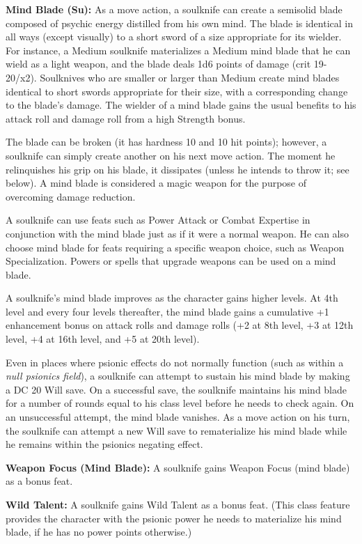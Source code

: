 \documentclass{article}
\begin{document}
\textbf{Mind Blade (Su):} As a move action, a soulknife can create a semisolid 
blade composed of psychic energy distilled from his own mind. The blade is identical 
in all ways (except visually) to a short sword of a size appropriate for its wielder. 
For instance, a Medium soulknife materializes a Medium mind blade that he can wield 
as a light weapon, and the blade deals 1d6 points of damage (crit 19-20/x2). Soulknives 
who are smaller or larger than Medium create mind blades identical to short swords 
appropriate for their size, with a corresponding change to the blade's damage. 
The wielder of a mind blade gains the usual benefits to his attack roll and damage 
roll from a high Strength bonus.

The blade can be broken (it has hardness 10 and 10 hit points); however, a soulknife 
can simply create another on his next move action. The moment he relinquishes his 
grip on his blade, it dissipates (unless he intends to throw it; see below). A 
mind blade is considered a magic weapon for the purpose of overcoming damage reduction.

A soulknife can use feats such as Power Attack or Combat Expertise in conjunction 
with the mind blade just as if it were a normal weapon. He can also choose mind 
blade for feats requiring a specific weapon choice, such as Weapon Specialization. 
Powers or spells that upgrade weapons can be used on a mind blade.

A soulknife's mind blade improves as the character gains higher levels. At 4th 
level and every four levels thereafter, the mind blade gains a cumulative +1 enhancement 
bonus on attack rolls and damage rolls (+2 at 8th level, +3 at 12th level, +4 at 
16th level, and +5 at 20th level).

Even in places where psionic effects do not normally function (such as within a 
\textit{null psionics field}), a soulknife can attempt to sustain his mind blade 
by making a DC 20 Will save. On a successful save, the soulknife maintains his 
mind blade for a number of rounds equal to his class level before he needs to check 
again. On an unsuccessful attempt, the mind blade vanishes. As a move action on 
his turn, the soulknife can attempt a new Will save to rematerialize his mind blade 
while he remains within the psionics negating effect.

\textbf{Weapon Focus (Mind Blade): }A soulknife gains Weapon Focus (mind blade) 
as a bonus feat.

\textbf{Wild Talent: }A soulknife gains Wild Talent as a bonus feat. (This class 
feature provides the character with the psionic power he needs to materialize his 
mind blade, if he has no power points otherwise.)
\end{document}
